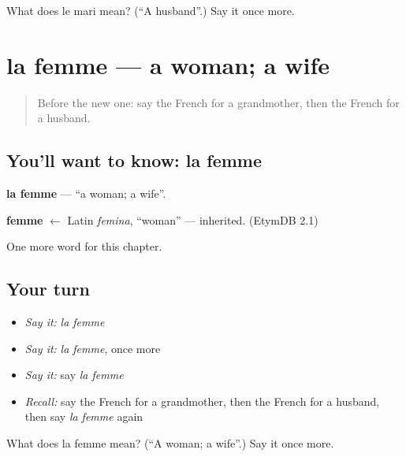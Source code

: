 \begin{tcolorbox}[breakable,colback=teal!4,colframe=teal!35!black,title={Before you move on}]
What does le mari mean? (\textquotedblleft{}A husband\textquotedblright{}.) Say it once more.
\end{tcolorbox}
\section[la femme]{la femme — a woman; a wife}

\label{lesson:FR-C57-femme}



\begin{quote}
Before the new one: say the French for a grandmother, then the French for a husband.
\end{quote}

\subsection*{You'll want to know: la femme}
\textbf{la femme} — \textquotedblleft{}a woman; a wife\textquotedblright{}.

\begin{cousinweb}
\textbf{femme} $\leftarrow$ Latin \emph{femina}, \textquotedblleft{}woman\textquotedblright{} — inherited. (EtymDB 2.1)
\end{cousinweb}

\begin{grammarlens}[title={What you've built}]
One more word for this chapter.
\end{grammarlens}

\subsection*{Your turn}
\begin{itemize}
\raggedright
  \item \emph{Say it:} \emph{la femme}
  \item \emph{Say it:} \emph{la femme}, once more
  \item \emph{Say it:} say \emph{la femme}
  \item \emph{Recall:} say the French for a grandmother, then the French for a husband, then say \emph{la femme} again
\end{itemize}

\begin{tcolorbox}[breakable,colback=teal!4,colframe=teal!35!black,title={Before you move on}]
What does la femme mean? (\textquotedblleft{}A woman; a wife\textquotedblright{}.) Say it once more.
\end{tcolorbox}
